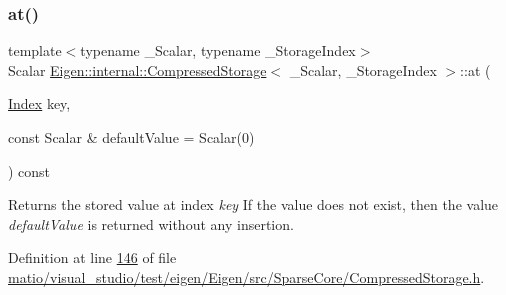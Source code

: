 \subsubsection{\texorpdfstring{at()}{at()}\hspace{0.1cm}{\footnotesize\ttfamily [2/2]}}
{\footnotesize\ttfamily template$<$typename \+\_\+\+Scalar, typename \+\_\+\+Storage\+Index$>$ \\
Scalar \hyperlink{class_eigen_1_1internal_1_1_compressed_storage}{Eigen\+::internal\+::\+Compressed\+Storage}$<$ \+\_\+\+Scalar, \+\_\+\+Storage\+Index $>$\+::at (\begin{DoxyParamCaption}\item[{\hyperlink{namespace_eigen_a62e77e0933482dafde8fe197d9a2cfde}{Index}}]{key,  }\item[{const Scalar \&}]{default\+Value = {\ttfamily Scalar(0)} }\end{DoxyParamCaption}) const\hspace{0.3cm}{\ttfamily [inline]}}

\begin{DoxyReturn}{Returns}
the stored value at index {\itshape key} If the value does not exist, then the value {\itshape default\+Value} is returned without any insertion. 
\end{DoxyReturn}


Definition at line \hyperlink{matio_2visual__studio_2test_2eigen_2_eigen_2src_2_sparse_core_2_compressed_storage_8h_source_l00146}{146} of file \hyperlink{matio_2visual__studio_2test_2eigen_2_eigen_2src_2_sparse_core_2_compressed_storage_8h_source}{matio/visual\+\_\+studio/test/eigen/\+Eigen/src/\+Sparse\+Core/\+Compressed\+Storage.\+h}.

\mbox{\label{class_eigen_1_1internal_1_1_compressed_storage_a70c2745dd270aaa44b415ec2e9bf2ae0}} 

